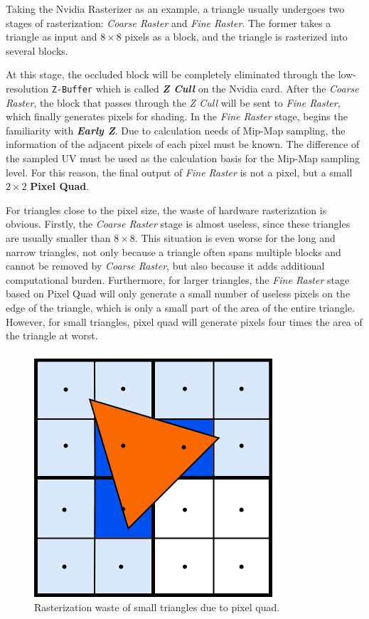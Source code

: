 \documentclass[10pt,journal,compsoc]{IEEEtran}
\begin{document}
\par Taking the Nvidia Rasterizer as an example, a triangle usually undergoes two stages of rasterization: \textit{Coarse Raster} and \textit{Fine Raster}. The former takes a triangle as input and $8\times8$ pixels as a block, and the triangle is rasterized into several blocks. 

\par At this stage, the occluded block will be completely eliminated through the low-resolution \texttt{Z-Buffer} which is called \textbf{\textit{Z Cull}} on the Nvidia card. After the \textit{Coarse Raster}, the block that passes through the \textit{Z Cull} will be sent to \textit{Fine Raster}, which finally generates pixels for shading. In the \textit{Fine Raster} stage, begins the familiarity with \textbf{\textit{\textit{Early Z}}}. Due to calculation needs of Mip-Map sampling, the information of the adjacent pixels of each pixel must be known. The difference of the sampled UV must be used as the calculation basis for the Mip-Map sampling level. For this reason, the final output of \textit{Fine Raster} is not a pixel, but a small $2\times2$ \textbf{Pixel Quad}.

\par For triangles close to the pixel size, the waste of hardware rasterization is obvious. Firstly, the \textit{Coarse Raster} stage is almost useless, since these triangles are usually smaller than $8\times8$. This situation is even worse for the long and narrow triangles, not only because a triangle often spans multiple blocks and cannot be removed by \textit{Coarse Raster}, but also because it adds additional computational burden. Furthermore, for larger triangles, the \textit{Fine Raster} stage based on Pixel Quad will only generate a small number of useless pixels on the edge of the triangle, which is only a small part of the area of the entire triangle. However, for small triangles, pixel quad will generate pixels four times the area of the triangle at worst.

\begin{figure}[H]
    \centering
    \includegraphics[scale=0.25]{img/PixelQuad.png}
    \caption{Rasterization waste of small triangles due to pixel quad.}
    \label{fig:pixelQuad}
\end{figure}
\end{document}
